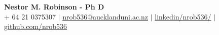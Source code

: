 \begin{center}
    \large\textbf{Nestor M. Robinson - Ph D} \\
    \small  + 64 21 0375307 $|$ \href{mailto:nrob536@aucklanduni.ac.nz}{nrob536@aucklanduni.ac.nz} $|$ 
    \href{https://www.linkedin.com/in/nrob536/}{linkedin/nrob536/} $|$
    \href{https://github.com/nrob536}{github.com/nrob536}
\end{center}
  